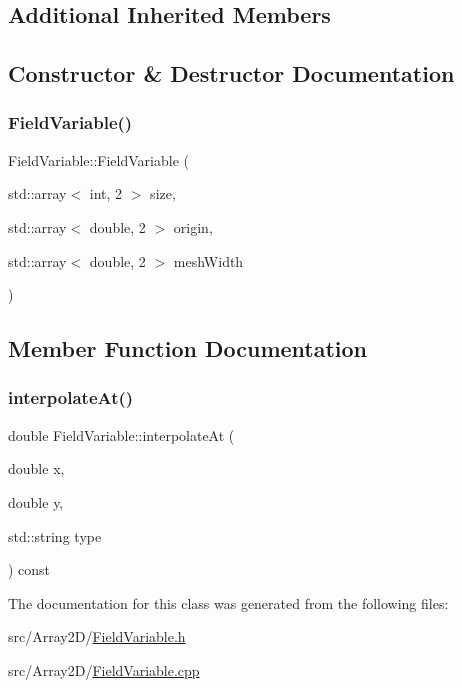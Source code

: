 \subsection*{Additional Inherited Members}


\subsection{Constructor \& Destructor Documentation}
\mbox{\label{classFieldVariable_aa0985778bc6331b74904a03c3ef67a98}} 
\subsubsection{\texorpdfstring{FieldVariable()}{FieldVariable()}}
{\footnotesize\ttfamily Field\+Variable\+::\+Field\+Variable (\begin{DoxyParamCaption}\item[{std\+::array$<$ int, 2 $>$}]{size,  }\item[{std\+::array$<$ double, 2 $>$}]{origin,  }\item[{std\+::array$<$ double, 2 $>$}]{mesh\+Width }\end{DoxyParamCaption})}



\subsection{Member Function Documentation}
\mbox{\label{classFieldVariable_aa48ebd10eadb5e604d92de54943b3e3f}} 
\subsubsection{\texorpdfstring{interpolateAt()}{interpolateAt()}}
{\footnotesize\ttfamily double Field\+Variable\+::interpolate\+At (\begin{DoxyParamCaption}\item[{double}]{x,  }\item[{double}]{y,  }\item[{std\+::string}]{type }\end{DoxyParamCaption}) const}



The documentation for this class was generated from the following files\+:\begin{DoxyCompactItemize}
\item 
src/\+Array2\+D/\mbox{\hyperlink{FieldVariable_8h}{Field\+Variable.\+h}}\item 
src/\+Array2\+D/\mbox{\hyperlink{FieldVariable_8cpp}{Field\+Variable.\+cpp}}\end{DoxyCompactItemize}
